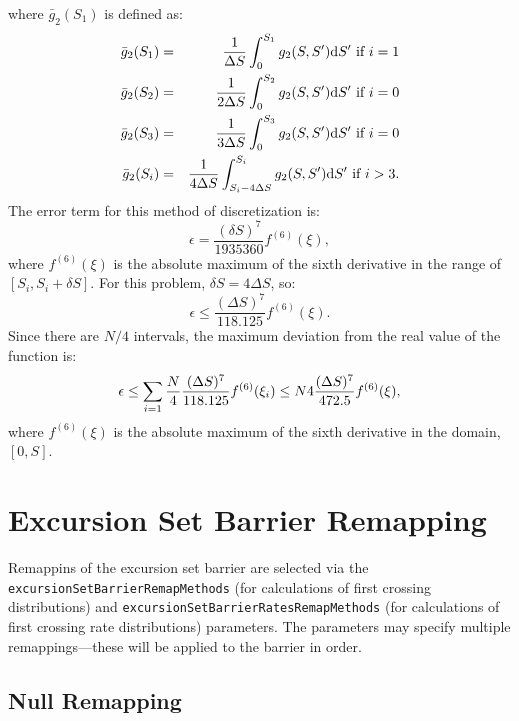 where $\bar{g}_2(S_1)$ is defined as:
\begin{eqnarray}
      \bar{g}_2(S_1) &=& \frac{1}{\Delta S} \int_{0}^{S_1} g_2(S,S^\prime){\rm d}S^\prime     \hbox{ if } i = 1 \\
      \bar{g}_2(S_2) &=& \frac{1}{2 \Delta S} \int_{0}^{S_2} g_2(S,S^\prime){\rm d}S^\prime     \hbox{ if } i = 0 \\
      \bar{g}_2(S_3) &=& \frac{1}{3 \Delta S} \int_{0}^{S_3} g_2(S,S^\prime){\rm d}S^\prime     \hbox{ if } i = 0 \\
      \bar{g}_2(S_i) &=& \frac{1}{4 \Delta S} \int_{S_i - 4 \Delta S}^{S_i} g_2(S,S^\prime){\rm d}S^\prime      \hbox{ if } i > 3.
\end{eqnarray}
The error term for this method of discretization is:
\begin{equation}
  \epsilon = \frac{(\delta S)^7}{1935360} f^{(6)}(\xi),
\end{equation}
where $f^{(6)}(\xi)$ is the absolute maximum of the sixth derivative in the range of $[S_i , S_i + \delta S]$. For this problem, $\delta S = 4 \Delta S$, so:
\begin{equation}
  \epsilon \leq \frac{(\Delta S)^7}{118.125} f^{(6)}(\xi).
\end{equation}
Since there are $N/4$ intervals, the maximum deviation from the real value of the function is:
\begin{equation}
  \epsilon \leq \sum_{i=1}{\frac{N}{4}}\frac{(\Delta S)^7}{118.125} f^{(6)}(\xi _i) \nonumber\\
    \leq  N4\frac{(\Delta S)^7}{472.5} f^{(6)}(\xi),
\end{equation}
where $f^{(6)}(\xi)$ is the absolute maximum of the sixth derivative in the domain, $[0 , S]$.

\section{Excursion Set Barrier Remapping}

Remappins of the excursion set barrier are selected via the {\tt excursionSetBarrierRemapMethods} (for calculations of first crossing distributions) and {\tt excursionSetBarrierRatesRemapMethods} (for calculations of first crossing rate distributions) parameters. The parameters may specify multiple remappings---these will be applied to the barrier in order.

\subsection{Null Remapping}

